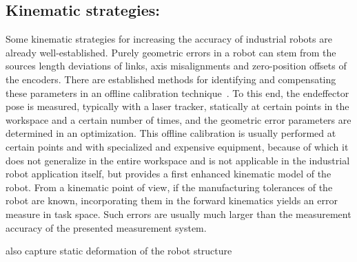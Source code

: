 \documentclass[5p,times,procedia]{elsarticle}
\begin{document}
\subsection{Kinematic strategies:}
Some kinematic strategies for increasing the accuracy of industrial robots are already well-established.
Purely geometric errors in a robot can stem from the sources length deviations of links, axis misalignments and zero-position offsets of the encoders.
There are established methods for identifying and compensating these parameters in an offline calibration technique~\cite{Wiest01}.
To this end, the endeffector pose is measured, typically with a laser tracker, statically at certain points in the workspace and a certain number of times, and the geometric error parameters are determined in an optimization.
This offline calibration is usually performed at certain points and with specialized and expensive equipment, because of which it does not generalize in the entire workspace and is not applicable in the industrial robot application itself, but provides a first enhanced kinematic model of the robot.
From a kinematic point of view, if the manufacturing tolerances of the robot are known, incorporating them in the forward kinematics yields an error measure in task space. Such errors are usually much larger than the measurement accuracy of the presented measurement system.

also capture static deformation of the robot structure
\end{document}
